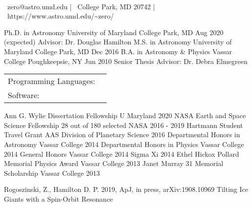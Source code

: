 \documentclass[]{awesome-cv}
\begin{document}
    
\begin{center}
	  \\
	\vspace{2mm}
	{\faEnvelope\ zero@astro.umd.edu} | {\faMapMarker\ College Park, MD 20742} | {\faLink\ https://www.astro.umd.edu/\textasciitilde{}zero/}
\end{center}
\begin{cventries}
	\cventry
	{Ph.D. in Astronomy}
	{University of Maryland}
	{College Park, MD}
	{Aug 2020 (expected)}
	{Advisor: Dr. Douglas Hamilton}
	\cventry
	{M.S. in Astronomy}
	{University of Maryland}
	{College Park, MD}
	{Dec 2016}
	{}
	\cventry
	{B.A. in Astronomy \& Physics}
	{Vassar College}
	{Poughkeepsie, NY}
	{Jun 2010}
	{Senior Thesis Advisor: Dr. Debra Elmegreen}
\end{cventries}

\vspace{-2mm}

\begin{cventries}
	\cventry
	{}
	{\def\arraystretch{1.15}{\begin{tabular}{ l l }
		Programming Languages:  & {\skill{ Python, C, Mathematica, \LaTeX, HTML}} \\
		Software:  & {\skill{ Unix, Jupyter Notebook, Microsoft Office}} \\
		\end{tabular}}}
	{}
	{}
	{}
\end{cventries}

\vspace{-7mm}
\begin{cvhonors}
	\cvhonor
	{Ann G. Wylie Dissertation Fellowship}
	{}
	{U Maryland}
	{2020}
	\cvhonor
	{NASA Earth and Space Science Fellowship}
	{28 out of 180 selected}
	{NASA}
	{2016 - 2019}
	\cvhonor
	{Hartmann Student Travel Grant}
	{}
	{AAS Division of Planetary Science}
	{2016}
	\cvhonor
	{Departmental Honors in Astronomy}
	{}
	{Vassar College}
	{2014}
	\cvhonor
	{Departmental Honors in Physics}
	{}
	{Vassar College}
	{2014}
	\cvhonor
	{General Honors}
	{}
	{Vassar College}
	{2014}
	\cvhonor
	{Sigma Xi}
	{}
	{}
	{2014}
	\cvhonor
	{Ethel Hickox Pollard Memorial Physics Award}
	{}
	{Vassar College}
	{2013}
	\cvhonor
	{Janet Murray \textquotesingle{}31 Memorial Scholarship}
	{}
	{Vassar College}
	{2013}
\end{cvhonors}
\begin{cventries}
	\cventry
	{Rogoszinski, Z., Hamilton D. P. 2019, ApJ, in press, arXiv:1908.10969}
	{Tilting Ice Giants with a Spin-Orbit Resonance}
	{}
	{}
	{}
	
	\vspace{-5mm}
\end{cventries}
\end{document}
